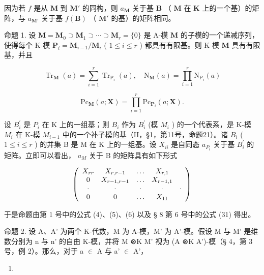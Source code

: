 因为若 \(f\) 是从 \(\mathbf{M}\) 到 \(\mathbf{M}'\) 的同构，则 \(a_{\mathbf{M}}\) 关于基 \(\mathbf{B}\) （ \(\mathbf{M}\) 在 \(\mathbf{K}\) 上的一个基）的矩阵，与 \(a_{\mathbf{M}'}\) 关于基 \(f(\mathbf{B})\) （ \(\mathbf{M}'\) 的基）的矩阵相同。

命题 1. 设 \(\mathbf{M} = \mathbf{M}_0 \supset \mathbf{M}_1 \supset \cdots \supset \mathbf{M}_r = \{0\}\) 是 A-模 \(\mathbf{M}\) 的子模的一个递减序列，使得每个 K-模 \(\mathbf{P}_i = \mathbf{M}_{i-1} / \mathbf{M}_i\) ( \(1 \leqslant i \leqslant r\) ) 都具有有限基。则 K-模 \(\mathbf{M}\) 具有有限基，并且

\[
\operatorname{Tr} _ {\mathbf {M}} (a) = \sum_ {i = 1} ^ {r} \operatorname{Tr} _ {\mathrm{P} _ {i}} (a), \quad \mathrm{N} _ {\mathbf {M}} (a) = \prod_ {i = 1} ^ {r} \mathrm{N} _ {\mathrm{P} _ {i}} (a)\tag{15}
\]

\[
\mathrm{Pc} _ {\mathbf {M}} (a; \mathbf {X}) = \prod_ {i = 1} ^ {r} \mathrm{Pc} _ {\mathbf {P} _ {i}} (a; \mathbf {X}).
\]

设 \(B_{i}^{\prime}\) 是 \(P_{i}\) 在 K 上的一组基；则 \(B_{i}\) 作为 \(B_{i}^{\prime}\) (模 \(M_{i}\) ) 的一个代表系，是 K-模 \(M_{i}\) 在 K-模 \(M_{i-1}\) 中的一个补子模的基（II，§1，第11号，命题21）。诸 \(B_{i}\) ( \(1 \leqslant i \leqslant r\) ) 的并集 B 是 M 在 K 上的一组基。设 \(X_{ii}\) 是自同态 \(a_{P_{i}}\) 关于基 \(B_{i}^{\prime}\) 的矩阵。立即可以看出， \(a_{M}\) 关于 B 的矩阵具有如下形式

\[
\left( \begin{array}{c c c c c} X _ {r r} & X _ {r, r - 1} & \ldots & X _ {r, 1} \\ 0 & X _ {r - 1, r - 1} & \ldots & X _ {r - 1, 1} \\ \cdot & \cdot & \cdot & \cdot & \cdot \\ 0 & 0 & \ldots & X _ {1 1} \end{array} \right)
\]

于是命题由第 1 号中的公式 (4)、(5)、(6) 以及 § 8 第 6 号中的公式 (31) 得出。

命题 2. 设 A、A' 为两个 K-代数，M 为 A-模，M' 为 A'-模。假设 M 与 M' 是维数分别为 n 与 n' 的自由 K-模，并将 M ⊗K M' 视为 (A ⊗K A')-模（§ 4，第 3 号，例 2）。那么，对于 a \ensuremath{\in} A 与 a' \ensuremath{\in} A'，

\begin{enumerate}
\def\labelenumi{(\arabic{enumi})}
\setcounter{enumi}{15}
\tightlist
\item
\end{enumerate}

